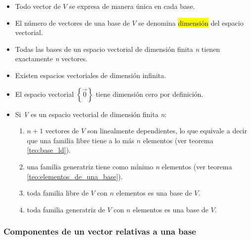 \begin{itemize}
  \item Todo vector de \(V\) se expresa de manera única en cada base.
  \item El número de vectores de una base de \(V\) se denomina \hl{dimensión} del espacio vectorial.
  \item Todas las bases de un espacio vectorial de dimensión finita \textit{n} tienen exactamente \textit{n} vectores.
  \item Existen espacios vectoriales de dimensión infinita.
  \item El espacio vectorial \(\left\{\vec{0}\right\}\) tiene dimensión cero por definición.
  \item Si \textit{V} es un espacio vectorial de dimensión finita \textit{n}:
  \begin{enumerate}
    \item \(n+1\) vectores de \(V\) son linealmente dependientes, lo que equivale a decir que una familia libre tiene a lo más \(n\) elementos (ver teorema \ref{teo:base_ld}).
    \item una familia generatriz tiene como mínimo \textit{n} elementos (ver teorema \ref{teo:elementos_de_una_base}).
    \item toda familia libre de \(V\) con \(n\) elementos es una base de \(V\).
    \item toda familia generatriz de \(V\) con \(n\) elementos es una base de \(V\).
  \end{enumerate}
\end{itemize}

\label{teo:base_ld}

\label{teo:elementos_de_una_base}

\subsubsection{Componentes de un vector relativas a una base}

